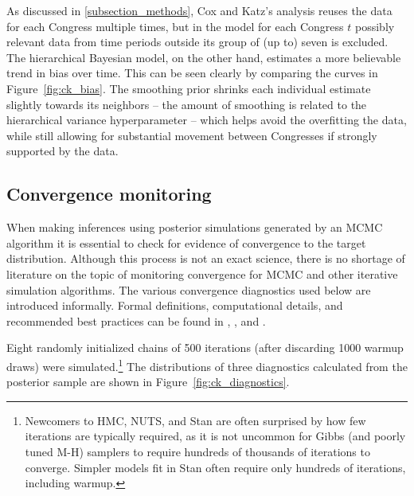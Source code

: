 As discussed in \ref{subsection_methods}, Cox and Katz's analysis reuses the data for each Congress multiple times, but in the model for each Congress $t$ possibly relevant data from time periods outside its group of (up to) seven is excluded. The hierarchical Bayesian model, on the other hand, estimates a more believable trend in bias over time. This can be seen clearly by comparing the curves in Figure~\ref{fig:ck_bias}. The smoothing prior shrinks each individual estimate slightly towards its neighbors -- the amount of smoothing is related to the hierarchical variance hyperparameter -- which helps avoid the overfitting the data, while still allowing for substantial movement between Congresses if strongly supported by the data.  

\subsection{Convergence monitoring}
\label{subsection_convergence}

When making inferences using posterior simulations generated by an MCMC algorithm it is essential to check for evidence of convergence to the target distribution. Although this process is not an exact science, there is no shortage of literature on the topic of monitoring convergence for MCMC and other iterative simulation algorithms. The various convergence diagnostics used below are introduced informally. Formal definitions, computational details, and recommended best practices can be found in , , and .

Eight randomly initialized chains of 500 iterations (after discarding 1000 warmup draws) were simulated.\footnote{Newcomers to HMC, NUTS, and Stan are often surprised by how few iterations are typically required, as it is not uncommon for Gibbs (and poorly tuned M-H) samplers to require hundreds of thousands of iterations to converge. Simpler models fit in Stan often require only hundreds of iterations, including warmup.} The distributions of three diagnostics calculated from the posterior sample are shown in Figure~\ref{fig:ck_diagnostics}. 

